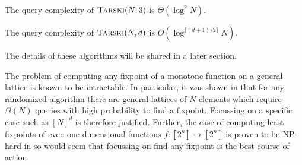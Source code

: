 \begin{theorem}
  The query complexity of $\textsc{Tarski}(N, 3)$ is $\Theta(\log^2 N)$.
\end{theorem}
\begin{theorem}
  The query complexity of $\textsc{Tarski}(N, d)$ is $O(\log^{\lceil (d+1)/2 \rceil} N)$.
\end{theorem}
The details of these algorithms will be shared in a later section.
\begin{remark}
  The problem of computing any fixpoint of a monotone function on a general lattice
  is known to be intractable. In particular, it was shown in \citep{changComplexity}
  that for any randomized algorithm there are general lattices of $N$ elements 
  which require $\Omega(N)$ queries with high probability to find a fixpoint.
  Focussing on a specific case such as $[N]^d$ is therefore justified.
  Further, the case of computing least fixpoints of even one dimensional
  functions $f : [2^n] \to [2^n]$ is proven to be NP-hard in \citep{lowerBound}
  so would seem that focussing on find any fixpoint is the best course of action.
\end{remark}
